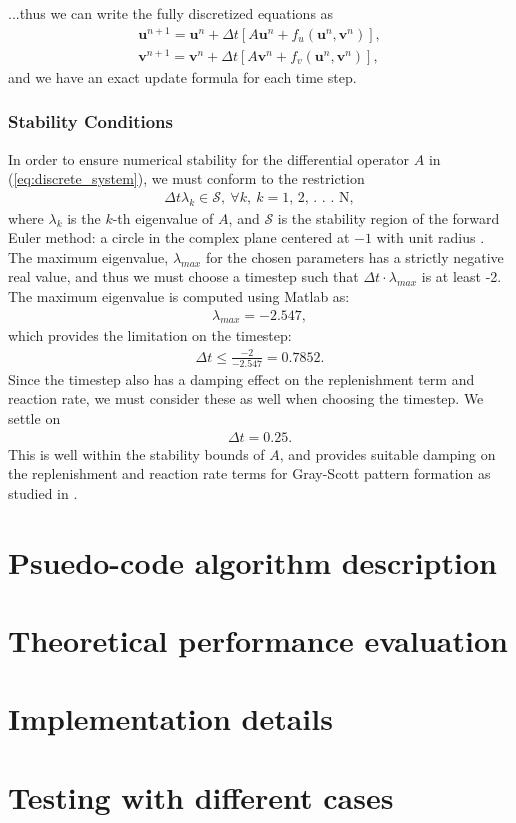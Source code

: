\documentclass[a4paper,11pt]{article}
\newcommand{\ba}[1]{\begin{align*}    #1    \end{align*}}
\newcommand{\ban}[1]{\begin{align}    #1    \end{align}}
\renewcommand{\vec}[1]{\mathbf{#1}}
\begin{document}
...thus we can write the fully discretized equations as
\ban{
\label{eq:discrete_system}
\vec{u}^{n+1} = \vec{u}^{n} + \Delta t [A \vec{u}^{n} + f_u(\vec{u}^{n},\vec{v}^{n})],\\
\vec{v}^{n+1} = \vec{v}^{n} + \Delta t [A \vec{v}^{n} + f_v(\vec{u}^{n},\vec{v}^{n})],
}
and we have an exact update formula for each time step.

\subsubsection*{Stability Conditions}
In order to ensure numerical stability for the differential operator $A$ in  (\ref{eq:discrete_system}), we must conform to the restriction
\ba{
\Delta t \lambda_k \in \mathcal{S}, \ \forall k, \ k = \text{1, 2, . . . N},
}
where $\lambda_k$ is the $k$-th eigenvalue of $A$, and $\mathcal{S}$ is the stability region of the forward Euler method: a circle in the complex plane centered at $-1$ with unit radius \cite{Edsberg}.  The maximum eigenvalue, $\lambda_{max}$ for the chosen parameters has a strictly negative real value, and thus we must choose a timestep such that $\Delta t \cdot \lambda_{max}$ is at least -2.  The maximum eigenvalue is computed using Matlab as:
\ba{
\lambda_{max} = -2.547,
}
which provides the limitation on the timestep:
\ba{
\Delta t \le \frac{-2}{-2.547} = 0.7852.
}
Since the timestep also has a damping effect on the replenishment term and reaction rate, we must consider these as well when choosing the timestep.  We settle on 
\ba{
\Delta t = 0.25.
}
This is well within the stability bounds of $A$, and provides suitable damping on the replenishment and reaction rate terms for Gray-Scott pattern formation as studied in \cite{Wang}.

\section*{Psuedo-code algorithm description}
\section*{Theoretical performance evaluation}
\section*{Implementation details}
\section*{Testing with different cases}
\end{document}
